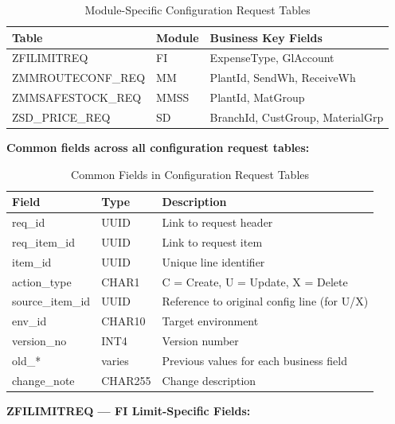 \documentclass[12pt,a4paper]{report}
\begin{document}
\begin{table}[H]
\centering\small
\begin{tabularx}{\textwidth}{|l|l|X|}
  \hline
  \rowcolor{tableheadpeach}
  \textbf{Table} & \textbf{Module} & \textbf{Business Key Fields} \\ \hline
  ZFILIMITREQ        & FI   & ExpenseType, GlAccount \\ \hline
  ZMMROUTECONF\_REQ  & MM   & PlantId, SendWh, ReceiveWh \\ \hline
  ZMMSAFESTOCK\_REQ  & MMSS & PlantId, MatGroup \\ \hline
  ZSD\_PRICE\_REQ    & SD   & BranchId, CustGroup, MaterialGrp \\ \hline
\end{tabularx}
\caption{Module-Specific Configuration Request Tables}
\label{tab:config-req-tables}
\end{table}

\noindent\textbf{Common fields across all configuration request tables:}

\begin{table}[H]
\centering\small
\begin{tabularx}{\textwidth}{|l|l|X|}
  \hline
  \rowcolor{tableheadpeach}
  \textbf{Field} & \textbf{Type} & \textbf{Description} \\ \hline
  req\_id          & UUID   & Link to request header \\ \hline
  req\_item\_id    & UUID   & Link to request item \\ \hline
  item\_id         & UUID   & Unique line identifier \\ \hline
  action\_type     & CHAR1  & C = Create, U = Update, X = Delete \\ \hline
  source\_item\_id & UUID   & Reference to original config line (for U/X) \\ \hline
  env\_id          & CHAR10 & Target environment \\ \hline
  version\_no      & INT4   & Version number \\ \hline
  old\_*           & varies & Previous values for each business field \\ \hline
  change\_note     & CHAR255& Change description \\ \hline
\end{tabularx}
\caption{Common Fields in Configuration Request Tables}
\label{tab:common-req-fields}
\end{table}

\noindent\textbf{ZFILIMITREQ --- FI Limit-Specific Fields:}
\end{document}
